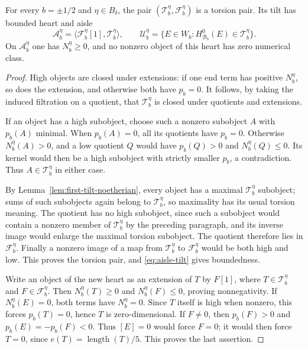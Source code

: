 \begin{lemma}\label{lem:second-tilt}
For every $b=\pm1/2$ and $\eta\in B_\delta$, the pair
$(\mathcal T_b^\eta,\mathcal F_b^\eta)$ is a torsion pair.  Its tilt
has bounded heart and aisle
\[
 \mathcal A_b^\eta=\langle\mathcal F_b^\eta[1],\mathcal T_b^\eta\rangle,
 \qquad \mathcal U_b^\eta
   =\{E\in W_b:H^0_{\mathcal B_b}(E)\in\mathcal T_b^\eta\}.
\]
On $\mathcal A_b^\eta$ one has $N_b^\eta\geq0$, and no nonzero object
of this heart has zero numerical class.
\end{lemma}

\begin{proof}
High objects are closed under extensions: if one end term has positive
$N_b^\eta$, so does the extension, and otherwise both have $p_b=0$.
It follows, by taking the induced filtration on a quotient, that
$\mathcal T_b^\eta$ is closed under quotients and extensions.

If an object has a high subobject, choose such a nonzero subobject $A$
with $p_b(A)$ minimal.  When $p_b(A)=0$, all its quotients have
$p_b=0$.  Otherwise $N_b^\eta(A)>0$, and a low quotient $Q$ would
have $p_b(Q)>0$ and $N_b^\eta(Q)\leq0$.  Its kernel would then be a
high subobject with strictly smaller $p_b$, a contradiction.  Thus
$A\in\mathcal T_b^\eta$ in either case.

By Lemma~\ref{lem:first-tilt-noetherian}, every object has a maximal
$\mathcal T_b^\eta$ subobject; sums of such subobjects again belong to
$\mathcal T_b^\eta$, so maximality has its usual torsion meaning.  The
quotient has no high subobject, since such a subobject would contain
a nonzero member of $\mathcal T_b^\eta$ by the preceding paragraph,
and its inverse image would enlarge the maximal torsion subobject.
The quotient therefore lies in $\mathcal F_b^\eta$.  Finally a
nonzero image of a map from $\mathcal T_b^\eta$ to
$\mathcal F_b^\eta$ would be both high and low.  This proves the
torsion pair, and \eqref{eq:aisle-tilt} gives boundedness.

Write an object of the new heart as an extension of $T$ by $F[1]$,
where $T\in\mathcal T_b^\eta$ and $F\in\mathcal F_b^\eta$.  Then
$N_b^\eta(T)\geq0$ and $N_b^\eta(F)\leq0$, proving nonnegativity.
If $N_b^\eta(E)=0$, both terms have $N_b^\eta=0$.  Since $T$ itself
is high when nonzero, this forces $p_b(T)=0$, hence $T$ is
zero-dimensional.  If $F\ne0$, then $p_b(F)>0$ and
$p_b(E)=-p_b(F)<0$.  Thus $[E]=0$ would force $F=0$; it would then
force $T=0$, since $e(T)=\operatorname{length}(T)/5$.  This proves
the last assertion.
\end{proof}

